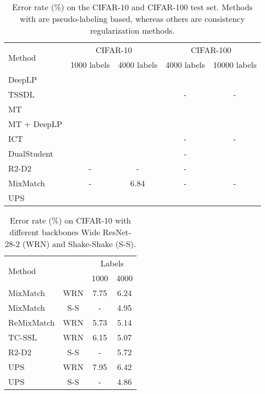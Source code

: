 \documentclass{article} \usepackage{iclr2021_conference,times}
\begin{document}
\begin{table}[t!]
\vspace{-5mm}
\caption{Error rate (\%) on the CIFAR-10 and CIFAR-100 test set. Methods with  are pseudo-labeling based, whereas others are consistency regularization methods.}
\label{tab:comaprison_SSL_CIFAR10_100}
\centering
\small
\begin{tabular}{l|cc|cc}
\hline
\multicolumn{1}{l|}{\multirow{2}{*}{Method}} & \multicolumn{2}{c|}{CIFAR-10} & \multicolumn{2}{c}{CIFAR-100} \\  
\multicolumn{1}{c|}{} & 1000 labels & 4000 labels & 4000 labels & 10000 labels \\ 

\hline


DeepLP  &  &  &  &  \\
TSSDL  &  &  & - & - \\ 
MT  &  &  &  & \\ 
MT + DeepLP &  &  &  & \\
ICT  &  &  & - & - \\ 
DualStudent  &  &  & - &  \\ 
R2-D2 & - & - & - &  \\
MixMatch  & - & 6.84 & - & - \\
\hline
UPS &  &  &  &  \\ 
\hline
\end{tabular}
\vspace{-4mm}
\end{table}












\begin{wraptable}{r}{0.48\linewidth}
\vspace{-4mm}
\caption{Error rate (\%) on CIFAR-10 with different backbones Wide ResNet-28-2 (WRN) and Shake-Shake (S-S).}
\centering

\label{tab:backbone}
\small
\begin{tabular}{l|ccc}
\hline
\multicolumn{1}{l|}{\multirow{2}{*}{Method}} & {\multirow{2}{*}{Backbone}} & \multicolumn{2}{c}{Labels} \\  
\multicolumn{1}{c|}{} & & 1000 & 4000\\
\hline





MixMatch & WRN & 7.75 & 6.24 \\ 
MixMatch & S-S & - & 4.95 \\
ReMixMatch & WRN & 5.73 & 5.14\\
TC-SSL & WRN & 6.15 & 5.07 \\
R2-D2 & S-S & - & 5.72 \\
 
 \hline UPS & WRN & 7.95 & 6.42 \\ 
UPS & S-S & - & 4.86 \\ \hline
\end{tabular}
\end{wraptable} 
\end{document}
